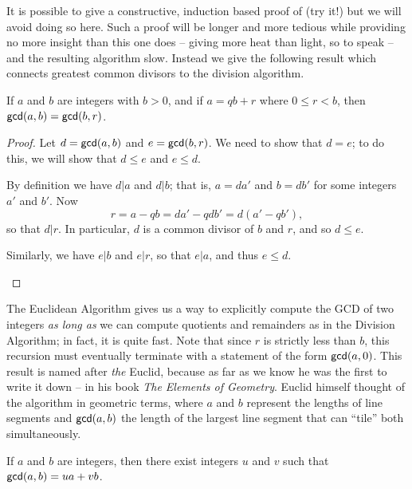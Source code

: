 It is possible to give a constructive, induction based proof of  (try it!) but we will avoid doing so here.
Such a proof will be longer and more tedious while providing no more insight than this one does -- giving more heat than light, so to speak -- and the resulting algorithm slow.
Instead we give the following result which connects greatest common divisors to the division algorithm.

\begin{prop}
If \(a\) and \(b\) are integers with \(b > 0\), and if \(a = qb + r\) where \(0 \leq r < b\), then \(\mathsf{gcd}(a, b) = \mathsf{gcd}(b, r)\).
\end{prop}

\begin{proof}
Let \(d = \mathsf{gcd}(a, b)\) and \(e = \mathsf{gcd}(b, r)\).
We need to show that \(d = e\); to do this, we will show that \(d \leq e\) and \(e \leq d\).
\begin{proplist}
\item By definition we have \(d|a\) and \(d|b\); that is, \(a = da'\) and \(b = db'\) for some integers \(a'\) and \(b'\).
Now \[ r = a - qb = da' - qdb' = d(a' - qb'), \] so that \(d|r\).
In particular, \(d\) is a common divisor of \(b\) and \(r\), and so \(d \leq e\).
\item Similarly, we have \(e|b\) and \(e|r\), so that \(e|a\), and thus \(e \leq d\).
\qedhere
\end{proplist}
\end{proof}

The Euclidean Algorithm gives us a way to explicitly compute the GCD of two integers \emph{as long as} we can compute quotients and remainders as in the Division Algorithm; in fact, it is quite fast.
Note that since \(r\) is strictly less than \(b\), this recursion must eventually terminate with a statement of the form \(\mathsf{gcd}(a, 0)\).
This result is named after \emph{the} Euclid, because as far as we know he was the first to write it down -- in his book \emph{The Elements of Geometry}.
Euclid himself thought of the algorithm in geometric terms, where \(a\) and \(b\) represent the lengths of line segments and \(\mathsf{gcd}(a, b)\) the length of the largest line segment that can ``tile'' both simultaneously.

\begin{thm}
If \(a\) and \(b\) are integers, then there exist integers \(u\) and \(v\) such that \(\mathsf{gcd}(a, b) = ua + vb\).
\end{thm}

